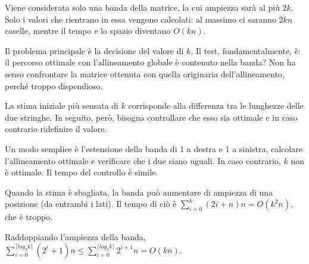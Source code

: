 Viene considerata solo una banda della matrice, la cui ampiezza sarà al più $2k$. Solo i valori che rientrano in essa vengono calcolati: al massimo ci saranno $2kn$ caselle, mentre il tempo e lo spazio diventano $O(kn)$.

Il problema principale è la decisione del valore di $k$. Il test, fondamentalmente, è: il percorso ottimale con l'allineamento globale è contenuto nella banda? Non ha senso confrontare la matrice ottenuta con quella originaria dell'allineamento, perché troppo dispendioso. 

La stima iniziale più sensata di $k$ corrisponde alla differenza tra le lunghezze delle due stringhe. In seguito, però, bisogna controllare che esso sia ottimale e in caso contrario ridefinire il valore.

Un modo semplice è l'estensione della banda di 1 a destra e 1 a sinistra, calcolare l'allineamento ottimale e verificare che i due siano uguali. In caso contrario, $k$ non è ottimale. Il tempo del controllo è simile.

Quando la stima è sbagliata, la banda può aumentare di ampiezza di una posizione (da entrambi i lati). Il tempo di ciò è $\sum_{i=0}^{k} (2i+n)n = O(k^2n)$, che è troppo. 

Raddoppiando l'ampiezza della banda, $\sum_{i=0}^{\lceil log_2k\rceil} (2^i+1)n \leq \sum_{i=0}^{\lceil log_2k \rceil} 2^{i+1}n = O(kn)$.

